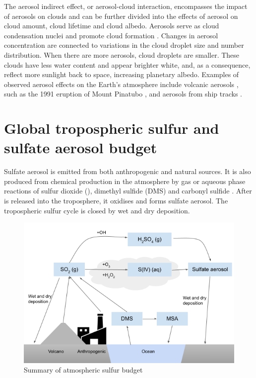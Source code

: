 The aerosol indirect effect, or aerosol-cloud interaction, encompasses the impact of aerosols on clouds and can be further divided into the effects of aerosol on cloud amount, cloud lifetime and cloud albedo.  Aerosols serve as cloud condensation nuclei and promote cloud formation \citep{albrechtAerosolsCloudMicrophysics1989}.  Changes in aerosol concentration are connected to variations in the cloud droplet size and number distribution. When there are more aerosols, cloud droplets are smaller. These clouds have less water content and appear brighter white, and, as a consequence, reflect more sunlight back to space, increasing planetary albedo. Examples of observed aerosol effects on the Earth’s atmosphere include volcanic aerosols \citep[e.g.][]{malavelleStrongConstraintsAerosol2017}, such as the 1991 eruption of Mount Pinatubo \citep{hansenPotentialClimateImpact1992}, and aerosols from ship tracks \citep{twohyEvaluationAerosolIndirect2005}. 



\section{Global tropospheric sulfur and sulfate aerosol budget}

Sulfate aerosol is emitted from both anthropogenic and natural sources. It is also produced from chemical production in the atmosphere by gas or aqueous phase reactions of sulfur dioxide (), dimethyl sulfide (DMS) and carbonyl sulfide \citep[OCS;][]{belvisoAssessmentMarineBiota2000}. After  is released into the troposphere, it oxidises and forms sulfate aerosol.  The tropospheric sulfur cycle is closed by wet and dry deposition.

\begin{figure}
    \centering
    \includegraphics[width=6in]{Chapter1/figs/sulfur_budget.png}
    \caption[Summary of atmospheric sulfur budget]{Summary of atmospheric sulfur budget}
    \label{fig:sulfur-budget}
\end{figure}


